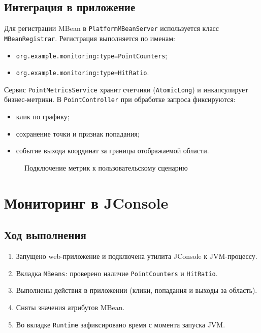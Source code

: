 \documentclass[12pt,a4paper]{article}
\begin{document}
\subsection{Интеграция в приложение}
Для регистрации MBean в \texttt{PlatformMBeanServer} используется класс \texttt{MBeanRegistrar}.
Регистрация выполняется по именам:
\begin{itemize}
    \item \texttt{org.example.monitoring:type=PointCounters};
    \item \texttt{org.example.monitoring:type=HitRatio}.
\end{itemize}

Сервис \texttt{PointMetricsService} хранит счетчики (\texttt{AtomicLong}) и инкапсулирует бизнес-метрики.
В \texttt{PointController} при обработке запроса фиксируются:
\begin{itemize}
    \item клик по графику;
    \item сохранение точки и признак попадания;
    \item событие выхода координат за границы отображаемой области.
\end{itemize}

\begin{figure}[h]
\centering
{}
\caption{Подключение метрик к пользовательскому сценарию}
\end{figure}

\section{Мониторинг в JConsole}

\subsection{Ход выполнения}
\begin{enumerate}
    \item Запущено web-приложение и подключена утилита JConsole к JVM-процессу.
    \item Вкладка \texttt{MBeans}: проверено наличие \texttt{PointCounters} и \texttt{HitRatio}.
    \item Выполнены действия в приложении (клики, попадания и выходы за область).
    \item Сняты значения атрибутов MBean.
    \item Во вкладке \texttt{Runtime} зафиксировано время с момента запуска JVM.
\end{enumerate}
\end{document}
